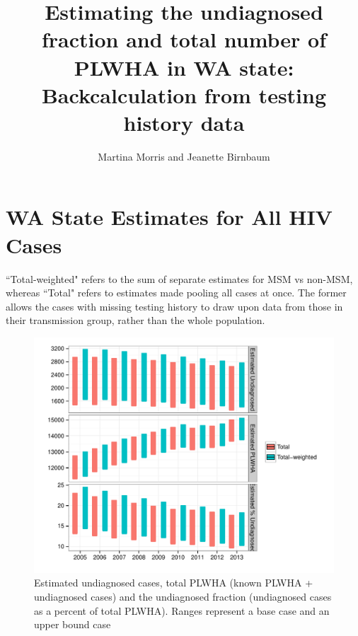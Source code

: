 \documentclass{article}\usepackage[]{graphicx}\usepackage[]{color}
\makeatletter
\def\maxwidth{ %
  \ifdim\Gin@nat@width>\linewidth
    \linewidth
  \else
    \Gin@nat@width
  \fi
}
\newenvironment{knitrout}{}{} %
\makeatother
\begin{document}
\title{Estimating the undiagnosed fraction and total number of PLWHA in WA state: Backcalculation from testing history data}
\author{Martina Morris and Jeanette Birnbaum}
\maketitle

\section{WA State Estimates for All HIV Cases}
``Total-weighted" refers to the sum of separate estimates for MSM vs non-MSM, whereas ``Total" refers to estimates made pooling all cases at once. The former allows the cases with missing testing history to draw upon data from those in their transmission group, rather than the whole population.

\begin{knitrout}\footnotesize
{}\color{fgcolor}\begin{figure}[h]


{\centering \includegraphics[width=\maxwidth]{figure/minimal-all-WA} 

}

\caption[Estimated undiagnosed cases, total PLWHA (known PLWHA + undiagnosed cases) and the undiagnosed fraction (undiagnosed cases as a percent of total PLWHA)]{Estimated undiagnosed cases, total PLWHA (known PLWHA + undiagnosed cases) and the undiagnosed fraction (undiagnosed cases as a percent of total PLWHA). Ranges represent a base case and an upper bound case\label{fig:all-WA}}
\end{figure}


\end{knitrout}
\end{document}
